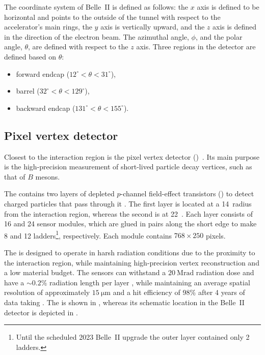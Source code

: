The coordinate system of Belle~II is defined as follows: the $x$ axis is defined to be horizontal and points to the outside of the tunnel with respect to the accelerator's
main rings, the $y$ axis is vertically upward, and the $z$ axis is defined in the direction of the electron beam. 
The azimuthal angle, $\phi$, and the polar angle, $\theta$, are defined with respect to the $z$ axis. 
Three regions in the detector are defined based on $\theta$: 
\begin{itemize}
    \item forward endcap (\mbox{$12^{\circ}<\theta<31^{\circ}$}), 
    \item barrel (\mbox{$32^{\circ}<\theta<129^{\circ}$}),
    \item backward endcap (\mbox{$131^{\circ}<\theta<155^{\circ}$}).
\end{itemize}


\subsection{Pixel vertex detector}\label{sec:pxd}

Closest to the interaction region is the pixel vertex detector (\PXD)~\cite{Belle-II:2010dht}.
Its main purpose is the high-precision measurement of short-lived particle decay vertices, such as that of $B$ mesons.

The \PXD contains two layers of depleted $p$-channel field-effect transistors (\DEPFET) to detect charged particles that pass through it \cite{Kemmer:1986vh}.
The first layer is located at a 14~\mm radius from the interaction region, whereas the second is at 22~\mm.
Each layer consists of 16 and 24 sensor modules, which are glued in pairs along the short edge to make 8 and 12 ladders\footnote{Until the scheduled 2023 Belle~II upgrade the outer layer contained only 2 ladders.}, respectively.
Each module contains $768\times250$ \DEPFET pixels.

The \PXD is designed to operate in harsh radiation conditions due to the proximity to the interaction region,
while maintaining high-precision vertex reconstruction and a low material budget.
The sensors can withstand a $20~\si{\mega\radian}$ 
radiation dose and have a $\sim 0.2\%$ radiation length per layer \cite{Belle-II:2010dht},
while maintaining an average spatial resolution of approximately $15~\si{\micro\meter}$ and a hit efficiency of 98\% after 4 years of data taking \cite{Belle-IIDEPFET:2022wis}.
The \PXD is shown in , whereas its schematic location in the Belle~II detector is depicted in .


